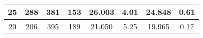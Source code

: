\begin{landscape}
\begin{table}[]
\begin{tabular}{|c|c|c|c|c|c|c|c|}
25                                                                        & 288                                                           & 381                                                            & 153                                                            & 26.003                                                              & 4.01                  & 24.848           & 0.61                  \\ \hline
20                                                                        & 206                                                           & 395                                                            & 189                                                            & 21.050                                                              & 5.25                  & 19.965           & 0.17                  \\ \hline
\end{tabular}
\end{table}
\end{landscape}